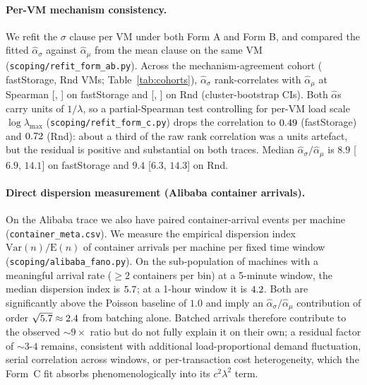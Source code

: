 \documentclass[11pt,a4paper]{article}
\begin{document}
\paragraph{Per-VM mechanism consistency.} We refit the $\sigma$ clause per
VM under both Form A and Form B, and compared the fitted $\hat\alpha_\sigma$
against $\hat\alpha_\mu$ from the mean clause on the same VM
(\texttt{scoping/refit\_form\_ab.py}). Across the mechanism-agreement
cohort (\ScalFsCohortN{} fastStorage, \ScalRnCohortN{} Rnd VMs;
Table~\ref{tab:cohorts}),
$\hat\alpha_\sigma$ rank-correlates with $\hat\alpha_\mu$ at Spearman
\ScalFsSpearman{} [\ScalFsSpearmanCiLo, \ScalFsSpearmanCiHi] on fastStorage
and \ScalRnSpearman{} [\ScalRnSpearmanCiLo, \ScalRnSpearmanCiHi] on Rnd
(cluster-bootstrap CIs). Both $\hat\alpha$s carry units of $1/\lambda$, so
a partial-Spearman test controlling for per-VM load scale
$\log \lambda_{\max}$ (\texttt{scoping/refit\_form\_c.py}) drops the
correlation to $0.49$ (fastStorage) and $0.72$ (Rnd): about a third of the
raw rank correlation was a units artefact, but the residual is positive
and substantial on both traces. Median $\hat\alpha_\sigma / \hat\alpha_\mu$
is $8.9$ [$6.9$, $14.1$] on fastStorage and $9.4$ [$6.3$, $14.3$] on Rnd.

\paragraph{Direct dispersion measurement (Alibaba container arrivals).}
On the Alibaba trace we also have paired container-arrival events per
machine (\texttt{container\_meta.csv}). We measure the empirical
dispersion index $\text{Var}(n)/\text{E}(n)$ of container arrivals per
machine per fixed time window
(\texttt{scoping/alibaba\_fano.py}). On the sub-population of machines
with a meaningful arrival rate ($\geq 2$ containers per bin) at a
5-minute window, the median dispersion index is $5.7$; at a 1-hour
window it is $4.2$. Both are significantly above the Poisson baseline
of $1.0$ and imply an $\hat\alpha_\sigma / \hat\alpha_\mu$ contribution
of order $\sqrt{5.7} \approx 2.4$ from batching alone. Batched arrivals
therefore contribute to the observed $\sim 9\times$ ratio but do not
fully explain it on their own; a residual factor of $\sim 3\text{-}4$
remains, consistent with additional load-proportional demand
fluctuation, serial correlation across windows, or per-transaction
cost heterogeneity, which the Form~C fit absorbs phenomenologically
into its $c^2\lambda^2$ term.
\end{document}
